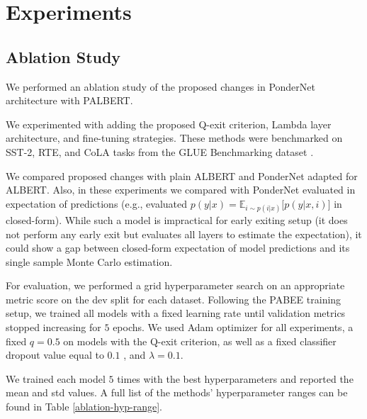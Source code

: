 \documentclass{article}
\begin{document}
\section{Experiments}
\label{experiments}
\subsection{Ablation Study}
\label{ablation-section}
We performed an ablation study of the proposed changes in PonderNet architecture with PALBERT. 

We experimented with adding the proposed Q-exit criterion, Lambda layer architecture, and fine-tuning strategies. These methods were benchmarked on SST-2, RTE, and CoLA tasks from the GLUE Benchmarking dataset \citep{glue}.

We compared proposed changes with plain ALBERT and PonderNet adapted for ALBERT. Also, in these experiments we compared with PonderNet evaluated in expectation of predictions (e.g., evaluated $p(y|x) = \mathbb{E}_{i \sim p(i|x)}\Big[p(y|x, i)\Big]$ in closed-form). While such a model is impractical for early exiting setup (it does not perform any early exit but evaluates all layers to estimate the expectation), it could show a gap between closed-form expectation of model predictions and its single sample Monte Carlo estimation.

For evaluation, we performed a grid hyperparameter search on an appropriate metric score on the dev split for each dataset. Following the PABEE training setup, we trained all models with a fixed learning rate until validation metrics stopped increasing for $5$ epochs. We used Adam optimizer \citep{adam} for all experiments, a fixed $q=0.5$ on models with the Q-exit criterion, as well as a fixed classifier dropout value equal to $0.1$ \citep{dropout}, and $\lambda = 0.1$.

We trained each model $5$ times with the best hyperparameters and reported the mean and std values. A full list of the methods' hyperparameter ranges can be found in Table \ref{ablation-hyp-range}.
\end{document}
